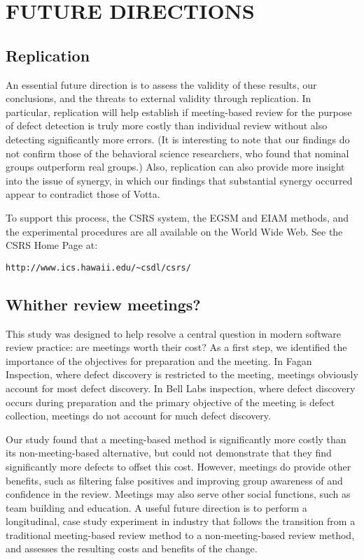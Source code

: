 \section{FUTURE DIRECTIONS}

\subsection{Replication}

An essential future direction is to assess the validity of these results,
our conclusions, and the threats to external validity through replication.
In particular, replication will help establish if meeting-based review for
the purpose of defect detection is truly more costly than individual review
without also detecting significantly more errors. (It is interesting to
note that our findings do not confirm those of the behavioral science
researchers, who found that nominal groups outperform real groups.) Also,
replication can also provide more insight into the issue of synergy, in
which our findings that substantial synergy occurred appear to contradict those of
Votta. 

To support this process, the CSRS system, the EGSM and EIAM methods, and
the experimental procedures are all available on the World Wide Web.  See
the CSRS Home Page at:
\small
\begin{verbatim}
http://www.ics.hawaii.edu/~csdl/csrs/
\end{verbatim}
\normalsize

\subsection{Whither review meetings?}

This study was designed to help resolve a central question in modern
software review practice: are meetings worth their cost?  As a first step,
we identified the importance of the objectives for preparation and the
meeting. In Fagan Inspection, where defect discovery is restricted to the
meeting, meetings obviously account for most defect discovery. In 
Bell Labs inspection, where defect discovery occurs during preparation and the
primary objective of the meeting is defect collection, meetings do not
account for much defect discovery.

Our study found that a meeting-based method is significantly more costly
than its non-meeting-based alternative, but could not demonstrate that they
find significantly more defects to offset this cost. However, meetings do
provide other benefits, such as filtering false positives and improving
group awareness of and confidence in the review. Meetings may also serve
other social functions, such as team building and education.  A useful
future direction is to perform a longitudinal, case study experiment in
industry that follows the transition from a traditional meeting-based
review method to a non-meeting-based review method, and assesses the resulting costs
and benefits of the change.

